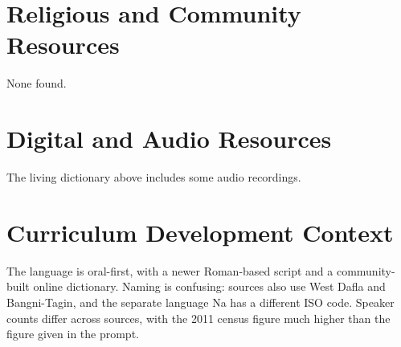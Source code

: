 \documentclass[12pt]{article}
\begin{document}
\section{Religious and Community Resources}
None found.

\section{Digital and Audio Resources}
The living dictionary above includes some audio recordings.

\section{Curriculum Development Context}
The language is oral-first, with a newer Roman-based script and a community-built online dictionary. Naming is confusing: sources also use West Dafla and Bangni-Tagin, and the separate language Na has a different ISO code. Speaker counts differ across sources, with the 2011 census figure much higher than the figure given in the prompt.
\end{document}
